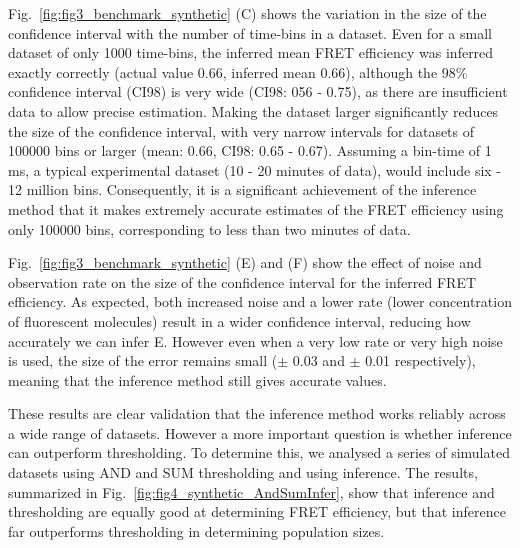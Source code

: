 Fig.~\ref{fig:fig3_benchmark_synthetic} (C) shows the variation in the size of the confidence interval with the number of time-bins in a dataset.  Even for a small dataset of only 1000 time-bins, the inferred mean FRET efficiency was inferred exactly correctly (actual value 0.66, inferred mean 0.66), although the $98 \%$ confidence interval (CI98) is very wide (CI98: 056 - 0.75), as there are insufficient data to allow precise estimation. Making the dataset larger significantly reduces the size of the confidence interval, with very narrow intervals for datasets of 100000 bins or larger (mean: 0.66, CI98: 0.65 - 0.67). Assuming a bin-time of 1 ms, a typical experimental dataset (10 - 20 minutes of data), would include six - 12 million bins. Consequently, it is a significant achievement of the inference method that it makes extremely accurate estimates of the FRET efficiency using only 100000 bins, corresponding to less than two minutes of data. 

Fig.~\ref{fig:fig3_benchmark_synthetic} (E) and (F) show the effect of noise and observation rate on the size of the confidence interval for the inferred FRET efficiency.  As expected, both increased noise and a lower rate (lower concentration of fluorescent molecules) result in a wider confidence interval, reducing how accurately we can infer E.  However even when a very low rate or very high noise is used, the size of the error remains small ($\pm$ 0.03 and $\pm$ 0.01 respectively), meaning that the inference method still gives accurate values.


These results are clear validation that the inference method works reliably across a wide range of datasets. However a more important question is whether inference can outperform thresholding. To determine this, we analysed a series of simulated datasets using AND and SUM thresholding and using inference.  The results, summarized in Fig.~\ref{fig:fig4_synthetic_AndSumInfer}, show that inference and thresholding are equally good at determining FRET efficiency, but that inference far outperforms thresholding in determining population sizes.


